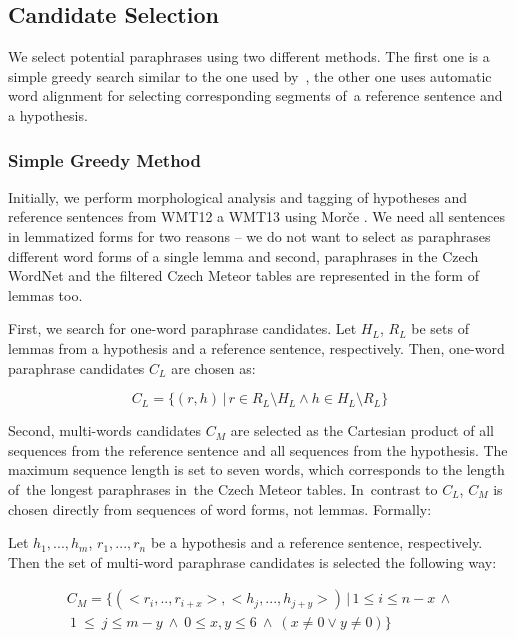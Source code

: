 \subsection{Candidate Selection}
\label{candidates}
We select potential paraphrases using two different methods. 
The first one is a simple greedy search similar to the one used by~\citet{kauchak}, the other one uses automatic word alignment for selecting corresponding segments of~a reference sentence and a hypothesis.

\subsubsection{Simple Greedy Method}
Initially, we perform morphological analysis and tagging of hypotheses and reference sentences from WMT12 a WMT13 using Morče \citep{morce:2007}. 
We need all sentences in lemmatized forms for two reasons -- we do not want to select as paraphrases different word forms of a single lemma and second, 
paraphrases in the Czech WordNet and the filtered Czech Meteor tables are represented in the form of lemmas too.

First, we search for one-word paraphrase candidates. 
Let $ H_{L} $, $ R_{L} $ be sets of lemmas from a hypothesis and a reference sentence, respectively. 
Then, one-word paraphrase candidates $C_{L} $ are chosen as:

\begin{equation*}
C_{L} = \{(r,h) \, | \, r \in R_{L} \setminus H_{L} \wedge h \in H_{L} \setminus R_{L} \} 
\end{equation*}

Second, multi-words candidates $ C_M $ are selected as the Cartesian product of all sequences from the reference sentence and all sequences from the hypothesis. 
The maximum sequence length is set to seven words, which corresponds to the length of~the longest paraphrases in~the Czech Meteor tables. 
In~contrast to $C_{L}$, $ C_M $ is chosen directly from sequences of word forms, not lemmas. Formally:

Let $ h_1,...,h_m $, $ r_1,..., r_n $  be a hypothesis and a reference sentence, respectively. 
Then the set of multi-word paraphrase candidates is selected the following way:

\begin{align*}
  C_{M} = \{ (<r_i,..,r_{i+x}>,<h_j,...,h_{j+y}>) \, | \, 1 \leq i \leq n-x \, \wedge \\ 
    \: 1~\leq~j \leq m-y  \: \wedge \: 0 \leq x,y \leq 6 \: \wedge \: (x \neq 0 \vee y \neq 0) \}
  \end{align*}
  
